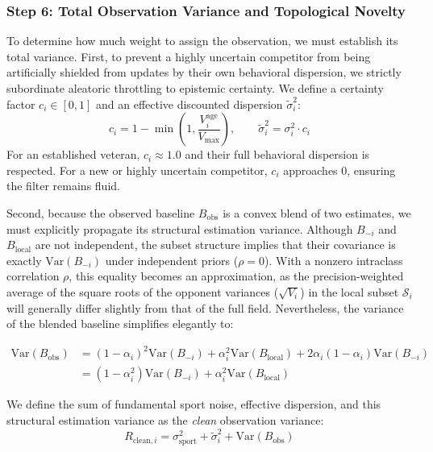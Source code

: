 \documentclass[12pt]{article}
\newcommand{\bobs}{B_{\mathrm{obs}}}
\begin{document}
	\subsubsection*{Step 6: Total Observation Variance and Topological Novelty}
	\label{step6}
	To determine how much weight to assign the observation, we must establish its total variance. First, to prevent a highly uncertain competitor from being artificially shielded from updates by their own behavioral dispersion, we strictly subordinate aleatoric throttling to epistemic certainty. We define a certainty factor $c_i \in [0,1]$ and an effective discounted dispersion $\tilde{\sigma}_i^2$:
	\begin{equation}
		c_i = 1 - \min\!\left(1,\frac{V_i^{\mathrm{age}}}{V_{\max}}\right), \qquad \tilde{\sigma}_i^2 = \sigma_i^2 \cdot c_i
	\end{equation}
	For an established veteran, $c_i \approx 1.0$ and their full behavioral dispersion is respected. For a new or highly uncertain competitor, $c_i$ approaches $0$, ensuring the filter remains fluid.

	Second, because the observed baseline $B_{\mathrm{obs}}$ is a convex blend of two estimates, we must explicitly propagate its structural estimation variance. Although $B_{-i}$ and $B_{\mathrm{local}}$ are not independent, the subset structure implies that their covariance is exactly $\mathrm{Var}(B_{-i})$ under independent priors ($\rho = 0$). With a nonzero intraclass correlation $\rho$, this equality becomes an approximation, as the precision-weighted average of the square roots of the opponent variances ($\sqrt{V_i}$) in the local subset $\mathcal{S}_i$ will generally differ slightly from that of the full field. Nevertheless, the variance of the blended baseline simplifies elegantly to:

	\begin{align}
		\mathrm{Var}(\bobs) &= (1 - \alpha_i)^2 \mathrm{Var}(B_{-i}) + \alpha_i^2 \mathrm{Var}(B_{\mathrm{local}}) + 2\alpha_i(1 - \alpha_i)\mathrm{Var}(B_{-i}) \nonumber\\
		&= (1 - \alpha_i^2) \mathrm{Var}(B_{-i}) + \alpha_i^2 \mathrm{Var}(B_{\mathrm{local}})
	\end{align}

	We define the sum of fundamental sport noise, effective dispersion, and this structural estimation variance as the \textit{clean} observation variance:
	\begin{equation}
		R_{\mathrm{clean},i} = \sigma_{\mathrm{sport}}^2 + \tilde{\sigma}_i^2 + \mathrm{Var}(B_{\mathrm{obs}})
	\end{equation}
\end{document}

